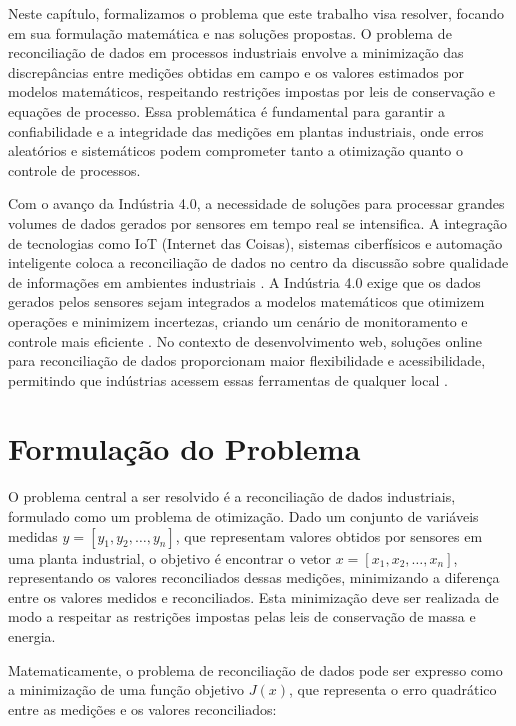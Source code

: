 \label{Cap:Problema}

Neste capítulo, formalizamos o problema que este trabalho visa resolver, focando em sua formulação matemática e nas soluções propostas. O problema de reconciliação de dados em processos industriais envolve a minimização das discrepâncias entre medições obtidas em campo e os valores estimados por modelos matemáticos, respeitando restrições impostas por leis de conservação e equações de processo. Essa problemática é fundamental para garantir a confiabilidade e a integridade das medições em plantas industriais, onde erros aleatórios e sistemáticos podem comprometer tanto a otimização quanto o controle de processos.

Com o avanço da Indústria 4.0, a necessidade de soluções para processar grandes volumes de dados gerados por sensores em tempo real se intensifica. A integração de tecnologias como IoT (Internet das Coisas), sistemas ciberfísicos e automação inteligente coloca a reconciliação de dados no centro da discussão sobre qualidade de informações em ambientes industriais \cite{industry40}. A Indústria 4.0 exige que os dados gerados pelos sensores sejam integrados a modelos matemáticos que otimizem operações e minimizem incertezas, criando um cenário de monitoramento e controle mais eficiente \cite{datareconciliationindustry4}. No contexto de desenvolvimento web, soluções online para reconciliação de dados proporcionam maior flexibilidade e acessibilidade, permitindo que indústrias acessem essas ferramentas de qualquer local \cite{websolutions}.

\section{Formulação do Problema}
\label{Sec:FormulacaoProblema}

O problema central a ser resolvido é a reconciliação de dados industriais, formulado como um problema de otimização. Dado um conjunto de variáveis medidas $y = [y_1, y_2, \dots, y_n]$, que representam valores obtidos por sensores em uma planta industrial, o objetivo é encontrar o vetor $x = [x_1, x_2, \dots, x_n]$, representando os valores reconciliados dessas medições, minimizando a diferença entre os valores medidos e reconciliados. Esta minimização deve ser realizada de modo a respeitar as restrições impostas pelas leis de conservação de massa e energia.

Matematicamente, o problema de reconciliação de dados pode ser expresso como a minimização de uma função objetivo $J(x)$, que representa o erro quadrático entre as medições e os valores reconciliados:

